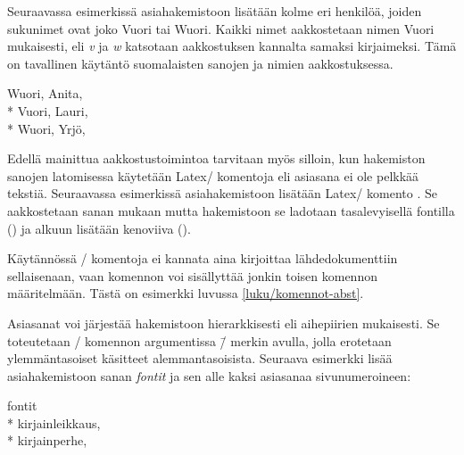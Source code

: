 Seuraavassa esimerkissä asiahakemistoon lisätään kolme eri henkilöä,
joiden sukunimet ovat joko Vuori tai Wuori. Kaikki nimet aakkostetaan
nimen Vuori mukaisesti, eli \emph{v} ja \emph{w} katsotaan aakkostuksen
kannalta samaksi kirjaimeksi. Tämä on tavallinen käytäntö suomalaisten
sanojen ja nimien aakkostuksessa.

\begin{koodilohkosis}
\end{koodilohkosis}

\begin{tulossis}
  Wuori, Anita,  \\*
  Vuori, Lauri,  \\*
  Wuori, Yrjö, 
\end{tulossis}

\noindent
Edellä mainittua aakkostustoimintoa tarvitaan myös silloin, kun
hakemiston sanojen latomisessa käytetään Latex\-/ komentoja eli asiasana
ei ole pelkkää tekstiä. Seuraavassa esimerkissä asiahakemistoon lisätään
Latex\-/ komento . Se aakkostetaan sanan
\emph{} mukaan mutta hakemistoon se ladotaan
tasalevyisellä fontilla () ja alkuun lisätään kenoviiva
().

\begin{koodilohkosis}
\end{koodilohkosis}

\noindent
Käytännössä \-/ komentoja ei kannata aina kirjoittaa
lähdedokumenttiin sellaisenaan, vaan komennon voi sisällyttää jonkin
toisen komennon määritelmään. Tästä on esimerkki luvussa
\ref{luku/komennot-abst}.

Asiasanat voi järjestää hakemistoon hierarkkisesti eli aihepiirien
mukaisesti. Se toteutetaan \-/ komennon argumentissa
\koodi{!}\=/ merkin avulla, jolla erotetaan ylemmäntasoiset käsitteet
alemmantasoisista. Seuraava esimerkki lisää asiahakemistoon sanan
\emph{fontit} ja sen alle kaksi asiasanaa sivunumeroineen:

\begin{koodilohkosis}
\end{koodilohkosis}

\begin{tulossis}
  fontit \\*
  \makebox[\sisennys]{}kirjainleikkaus,  \\*
  \makebox[\sisennys]{}kirjainperhe, 
\end{tulossis}

